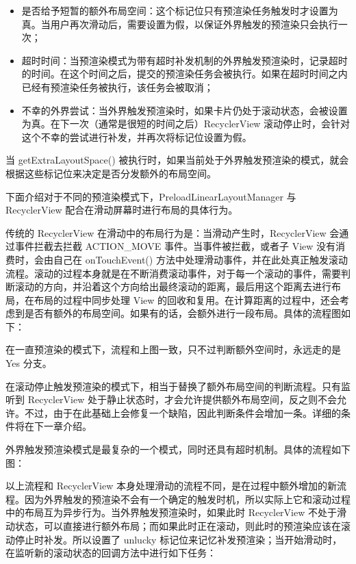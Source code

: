 \begin{itemize}
    \item 是否给予短暂的额外布局空间：这个标记位只有预渲染任务触发时才设置为真。当用户再次滑动后，需要设置为假，以保证外界触发的预渲染只会执行一次；
    \item 超时时间：当预渲染模式为带有超时补发机制的外界触发预渲染时，记录超时的时间。在这个时间之后，提交的预渲染任务会被执行。如果在超时时间之内已经有预渲染任务被执行，该任务会被取消；
    \item 不幸的外界尝试：当外界触发预渲染时，如果卡片仍处于滚动状态，会被设置为真。在下一次（通常是很短的时间之后）RecyclerView 滚动停止时，会针对这个不幸的尝试进行补发，并再次将标记位设置为假。
\end{itemize}

当 getExtraLayoutSpace() 被执行时，如果当前处于外界触发预渲染的模式，就会根据这些标记位来决定是否分发额外的布局空间。

下面介绍对于不同的预渲染模式下，PreloadLinearLayoutManager 与 RecyclerView 配合在滑动屏幕时进行布局的具体行为。

传统的 RecyclerView 在滑动中的布局行为是：当滑动产生时，RecyclerView 会通过事件拦截去拦截 ACTION\_MOVE 事件。当事件被拦截，或者子 View 没有消费时，会由自己在 onTouchEvent() 方法中处理滑动事件，并在此处真正触发滚动流程。滚动的过程本身就是在不断消费滚动事件，对于每一个滚动的事件，需要判断滚动的方向，并沿着这个方向给出最终滚动的距离，最后用这个距离去进行布局，在布局的过程中同步处理 View 的回收和复用。在计算距离的过程中，还会考虑到是否有额外的布局空间。如果有的话，会额外进行一段布局。具体的流程图如下：



在一直预渲染的模式下，流程和上图一致，只不过判断额外空间时，永远走的是 Yes 分支。

在滚动停止触发预渲染的模式下，相当于替换了额外布局空间的判断流程。只有监听到 RecyclerView 处于静止状态时，才会允许提供额外布局空间，反之则不会允许。不过，由于在此基础上会修复一个缺陷，因此判断条件会增加一条。详细的条件将在下一章介绍。

外界触发预渲染模式是最复杂的一个模式，同时还具有超时机制。具体的流程如下图：



以上流程和 RecyclerView 本身处理滑动的流程不同，是在过程中额外增加的新流程。因为外界触发的预渲染不会有一个确定的触发时机，所以实际上它和滚动过程中的布局互为异步行为。当外界触发预渲染时，如果此时 RecyclerView 不处于滑动状态，可以直接进行额外布局；而如果此时正在滚动，则此时的预渲染应该在滚动停止时补发。所以设置了 unlucky 标记位来记忆补发预渲染；当开始滑动时，在监听新的滚动状态的回调方法中进行如下任务：

